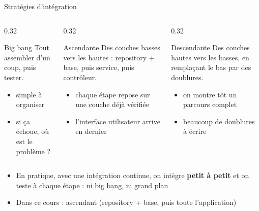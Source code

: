 \documentclass[aspectratio=169,10pt]{beamer}
\begin{document}
\begin{frame}{Stratégies d'intégration}
  \begin{columns}[T]
    \begin{column}{0.32\textwidth}
      \begin{block}{Big bang}
        \small
        Tout assembler d'un coup, puis tester.
        \begin{itemize}
          \item simple à organiser
          \item \alert{si ça échoue, où est le problème ?}
        \end{itemize}
      \end{block}
    \end{column}
    \begin{column}{0.32\textwidth}
      \begin{block}{Ascendante}
        \small
        Des couches basses vers les hautes : repository + base, puis service, puis contrôleur.
        \begin{itemize}
          \item chaque étape repose sur une couche déjà vérifiée
          \item l'interface utilisateur arrive en dernier
        \end{itemize}
      \end{block}
    \end{column}
    \begin{column}{0.32\textwidth}
      \begin{block}{Descendante}
        \small
        Des couches hautes vers les basses, en remplaçant le bas par des doublures.
        \begin{itemize}
          \item on montre tôt un parcours complet
          \item beaucoup de doublures à écrire
        \end{itemize}
      \end{block}
    \end{column}
  \end{columns}
  \vspace{3mm}
  \begin{itemize}
    \item En pratique, avec une intégration continue, on intègre \textbf{petit à petit} et on teste à chaque étape : ni big bang, ni grand plan
    \item Dans ce cours : ascendant (repository + base, puis toute l'application)
  \end{itemize}
\end{frame}
\end{document}
